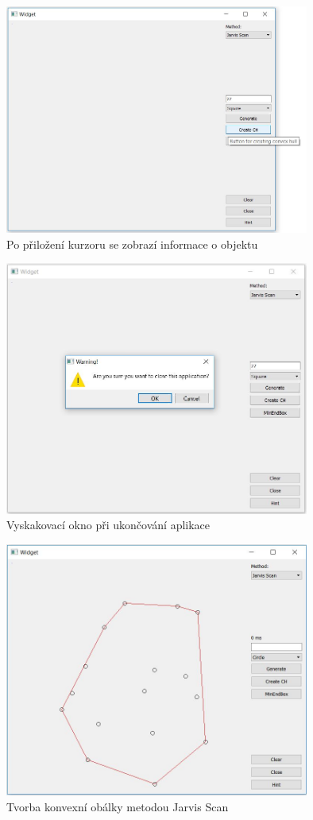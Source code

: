 \documentclass[a4paper, 12pt]{article}
\begin{document}
\begin{figure}[h!]
	\centering
	\includegraphics[width=10cm]{tooltip.jpg}
	\caption{Po přiložení kurzoru se zobrazí informace o objektu}
\end{figure}

\begin{figure}[h!]
	\centering
	\includegraphics[width=10cm]{close.jpg}
	\caption{Vyskakovací okno při ukončování aplikace}
\end{figure}

\begin{figure}[h!]
	\centering
	\includegraphics[width=10cm]{jarvis_ch.jpg}
	\caption{Tvorba konvexní obálky metodou Jarvis Scan}
\end{figure}
\end{document}

